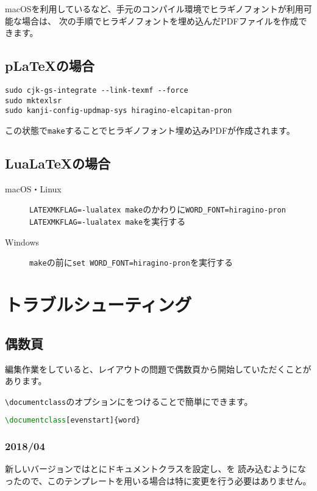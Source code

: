 macOSを利用しているなど、手元のコンパイル環境でヒラギノフォントが利用可能な場合は、
次の手順でヒラギノフォントを埋め込んだPDFファイルを作成できます。

\subsection{p\LaTeX の場合}

\begin{lstlisting}
sudo cjk-gs-integrate --link-texmf --force
sudo mktexlsr  
sudo kanji-config-updmap-sys hiragino-elcapitan-pron
\end{lstlisting}
  
この状態で\lstinline|make|することでヒラギノフォント埋め込みPDFが作成されます。

\subsection{Lua\LaTeX の場合}

\begin{description}
  \item[macOS・Linux] \lstinline|LATEXMKFLAG=-lualatex make|のかわりに\lstinline|WORD_FONT=hiragino-pron LATEXMKFLAG=-lualatex make|を実行する

  \item[Windows] \lstinline|make|の前に\lstinline|set WORD_FONT=hiragino-pron|を実行する
\end{description}

\section{トラブルシューティング}

\subsection{偶数頁}

編集作業をしていると、レイアウトの問題で偶数頁から開始していただくことがあります。

\lstinline|\documentclass|のオプションにをつけることで簡単にできます。

\begin{lstlisting}[language=TeX, mathescape]
\documentclass[evenstart]{word}
\end{lstlisting}

\subsubsection*{2018/04}
新しいバージョンではとにドキュメントクラスを設定し、\ovalbox{}を
読み込むようになったので、このテンプレートを用いる場合は特に変更を行う必要はありません。

